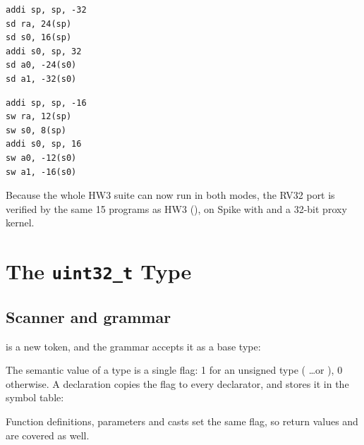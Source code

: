 \documentclass[12pt]{article}
\begin{document}
\begin{center}
\begin{minipage}[t]{0.47\linewidth}
\begin{lstlisting}[language=riscv,numbers=none,title={\codetitle{RV64}}]
addi sp, sp, -32
sd ra, 24(sp)
sd s0, 16(sp)
addi s0, sp, 32
sd a0, -24(s0)
sd a1, -32(s0)
\end{lstlisting}
\end{minipage}\hfill
\begin{minipage}[t]{0.47\linewidth}
\begin{lstlisting}[language=riscv,numbers=none,title={\codetitle{RV32}}]
addi sp, sp, -16
sw ra, 12(sp)
sw s0, 8(sp)
addi s0, sp, 16
sw a0, -12(s0)
sw a1, -16(s0)
\end{lstlisting}
\end{minipage}
\end{center}

Because the whole HW3 suite can now run in both modes, the RV32 port is verified by the same 15 programs
as HW3 (), on Spike with  and a 32-bit proxy kernel.

\section{The \texttt{uint32\_t} Type}

\subsection{Scanner and grammar}

 is a new token, and the grammar accepts it as a base type:


The semantic value of a type is a single flag: 1 for an unsigned type ( \ldots or
), 0 otherwise. A declaration copies the flag to every declarator, and  stores it in
the symbol table:


Function definitions, parameters and casts set the same flag, so return values and  are
covered as well.
\end{document}

